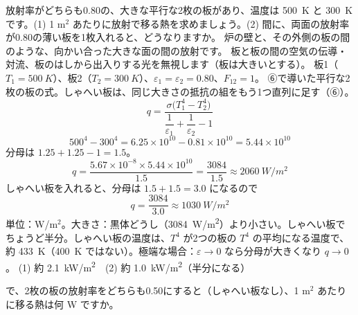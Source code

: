 \begin{phreidai}
\label{ph:熱-13:ex6}放射率がどちらも0.80の、大きな平行な2枚の板があり、温度は \qty{500}{K} と \qty{300}{K} です。(1) 1 m$^2$ あたりに放射で移る熱を求めましょう。(2) 間に、両面の放射率が0.80の薄い板を1枚入れると、どうなりますか。
\phbamen
炉の壁と、その外側の板の間のような、向かい合った大きな面の間の放射です。
\phmushi
板と板の間の空気の伝導・対流、板のはしから出入りする光を無視します（板は大きいとする）。
\phzu
板1（$T_1=\qty{500}{K}$）、板2（$T_2=\qty{300}{K}$）、$\varepsilon_1=\varepsilon_2=0.80$、$F_{12}=1$。
\phriyu
⑥で導いた平行な2枚の板の式。しゃへい板は、同じ大きさの抵抗の組をもう1つ直列に足す（⑥）。
\phtateru
\[ q=\frac{\sigma\bigl(T_1^4-T_2^4\bigr)}{\dfrac{1}{\varepsilon_1}+\dfrac{1}{\varepsilon_2}-1} \]
\phtoku
\[ 500^4-300^4=6.25\times10^{10}-0.81\times10^{10}=5.44\times10^{10} \]
分母は $1.25+1.25-1=1.5$。
\[ q=\frac{5.67\times10^{-8}\times5.44\times10^{10}}{1.5}=\frac{3084}{1.5}\approx\qty{2060}{W/m^2} \]
しゃへい板を入れると、分母は $1.5+1.5=3.0$ になるので
\[ q=\frac{3084}{3.0}\approx\qty{1030}{W/m^2} \]
\phtashikame
単位：W/m$^2$。大きさ：黒体どうし（\qty{3084}{W/m^2}）より小さい。しゃへい板でちょうど半分。しゃへい板の温度は、$T^4$ が2つの板の $T^4$ の平均になる温度で、約 \qty{433}{K}（\qty{400}{K} ではない）。極端な場合：$\varepsilon\to0$ なら分母が大きくなり $q\to0$。
\kotae (1) 約 \qty{2.1}{kW/m^2}　(2) 約 \qty{1.0}{kW/m^2}（半分になる）
\end{phreidai}
\begin{jibun}
で、2枚の板の放射率をどちらも0.50にすると（しゃへい板なし）、1 m$^2$ あたりに移る熱は何 W ですか。
\end{jibun}

